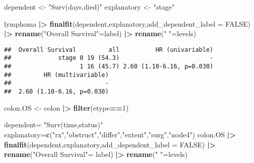 \documentclass[
]{article}
\newenvironment{Shaded}{\begin{snugshade}}{\end{snugshade}}
\newcommand{\AttributeTok}[1]{\textcolor[rgb]{0.13,0.29,0.53}{#1}}
\newcommand{\ConstantTok}[1]{\textcolor[rgb]{0.56,0.35,0.01}{#1}}
\newcommand{\DecValTok}[1]{\textcolor[rgb]{0.00,0.00,0.81}{#1}}
\newcommand{\FunctionTok}[1]{\textcolor[rgb]{0.13,0.29,0.53}{\textbf{#1}}}
\newcommand{\NormalTok}[1]{#1}
\newcommand{\OtherTok}[1]{\textcolor[rgb]{0.56,0.35,0.01}{#1}}
\newcommand{\SpecialCharTok}[1]{\textcolor[rgb]{0.81,0.36,0.00}{\textbf{#1}}}
\newcommand{\StringTok}[1]{\textcolor[rgb]{0.31,0.60,0.02}{#1}}
\begin{document}
\begin{Shaded}
\begin{Highlighting}[]
\NormalTok{dependent }\OtherTok{\textless{}{-}} \StringTok{"Surv(days,died)"}
\NormalTok{explanatory }\OtherTok{\textless{}{-}} \StringTok{"stage"}




\NormalTok{ lymphoma }\SpecialCharTok{|\textgreater{}} 
  \FunctionTok{finalfit}\NormalTok{(dependent,explanatory,}\AttributeTok{add\_dependent\_label =} \ConstantTok{FALSE}\NormalTok{) }\SpecialCharTok{|\textgreater{}} 
  \FunctionTok{rename}\NormalTok{(}\StringTok{"Overall Survival"}\OtherTok{=}\NormalTok{label) }\SpecialCharTok{|\textgreater{}} 
  \FunctionTok{rename}\NormalTok{(}\StringTok{" "}\OtherTok{=}\NormalTok{levels)  }
\end{Highlighting}
\end{Shaded}

\begin{verbatim}
##  Overall Survival         all          HR (univariable)
##             stage 0 19 (54.3)                         -
##                   1 16 (45.7) 2.60 (1.10-6.16, p=0.030)
##         HR (multivariable)
##                          -
##  2.60 (1.10-6.16, p=0.030)
\end{verbatim}

\begin{Shaded}
\begin{Highlighting}[]
\NormalTok{ colon.OS }\OtherTok{\textless{}{-}}\NormalTok{ colon }\SpecialCharTok{|\textgreater{}} 
   \FunctionTok{filter}\NormalTok{(etype}\SpecialCharTok{==}\DecValTok{1}\NormalTok{)}
 
 
\NormalTok{ dependent}\OtherTok{=} \StringTok{"Surv(time,status)"}
\NormalTok{explanatory}\OtherTok{=}\FunctionTok{c}\NormalTok{(}\StringTok{"rx"}\NormalTok{,}\StringTok{"obstruct"}\NormalTok{,}\StringTok{"differ"}\NormalTok{,}\StringTok{"extent"}\NormalTok{,}\StringTok{"surg"}\NormalTok{,}\StringTok{"node4"}\NormalTok{)  }
\NormalTok{colon.OS }\SpecialCharTok{|\textgreater{}} 
  \FunctionTok{finalfit}\NormalTok{(dependent,explanatory,}\AttributeTok{add\_dependent\_label =} \ConstantTok{FALSE}\NormalTok{) }\SpecialCharTok{|\textgreater{}} 
  \FunctionTok{rename}\NormalTok{(}\StringTok{"Overall Survival"}\OtherTok{=}\NormalTok{ label) }\SpecialCharTok{|\textgreater{}} 
  \FunctionTok{rename}\NormalTok{(}\StringTok{" "}\OtherTok{=}\NormalTok{levels)  }
\end{Highlighting}
\end{Shaded}
\end{document}
